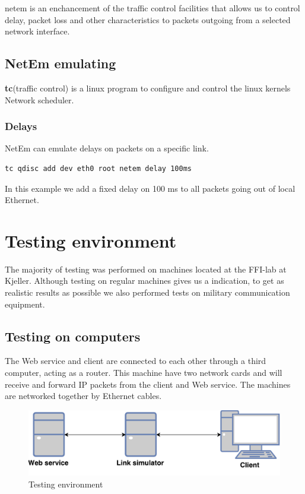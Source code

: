
\gls{netem} is an enchancement of the traffic control facilities that allows us
to control delay, packet loss and other characteristics to packets outgoing from
a selected network interface.

\subsection{NetEm emulating}

\textbf{tc}(traffic control) is a linux program to configure and control the
linux kernels Network scheduler.

\subsubsection{Delays}

NetEm can emulate delays on packets on a specific link.

\begin{lstlisting}[frame=single, caption="Emulating delay"]
  tc qdisc add dev eth0 root netem delay 100ms
\end{lstlisting}

In this example we add a fixed delay on 100 ms to all packets going out of local
Ethernet.

\section{Testing environment}

The majority of testing was performed on machines located at the FFI-lab at
Kjeller. Although testing on regular machines gives us a indication, to get as
realistic results as possible we also performed tests on military communication
equipment.

\subsection{Testing on computers}

 The Web service and client are connected to each other through a third
 computer, acting as a router. This machine have two network cards and will
 receive and forward IP packets from the client and Web service. The machines
 are networked together by Ethernet cables.

\begin{figure}[h]
\includegraphics[scale=0.6]{images/testing_environment.pdf}
\caption{Testing environment}
\label{figure-testing-environment}
\end{figure}

